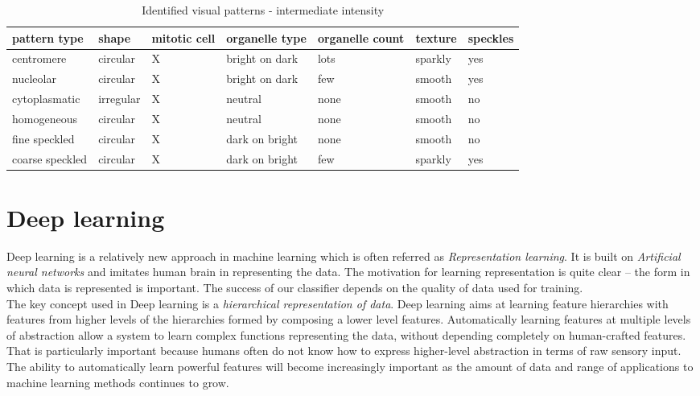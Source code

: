 \begin{table}
	\caption{Identified visual patterns - intermediate intensity}
	\label{tab:Vpatb}
	\small
	\begin{tabular}{|m{2.2cm}|m{1.4cm}|m{1.5cm}|m{1.5cm}|m{1.4cm}|m{1.6cm}|m{1.4cm}|}
		\hline
		\textbf{pattern type} & \textbf{shape} & \textbf{mitotic cell} & \textbf{organelle type} & \textbf{organelle count} & \textbf{texture} & \textbf{speckles} \\ \hline
		centromere & circular & X & bright on dark & lots & sparkly  & yes \\ \hline
		nucleolar & circular & X & bright on dark & few & smooth & yes \\ \hline
		cytoplasmatic & irregular & X & neutral & none & smooth  & no \\ \hline
		homogeneous & circular & X & neutral & none & smooth & no \\ \hline
		fine speckled & circular & X & dark on bright & none & smooth & no \\ \hline
		coarse speckled & circular & X & dark on bright & few & sparkly & yes \\ \hline
	\end{tabular}
	\normalsize
\end{table}



\section{Deep learning}

Deep learning is a relatively new approach in machine learning which is often referred  as \textit{Representation learning}. It is built on \textit{Artificial neural networks} and imitates human brain in representing the data. The motivation for learning representation is quite clear -- the form in which data is represented is important. The success of our classifier depends on the quality of data used for training. \\

The key concept used in Deep learning is a \textit{hierarchical representation of data}. Deep learning aims at learning feature hierarchies with features from higher levels of the hierarchies formed by composing a lower level features. Automatically learning features at multiple levels of abstraction allow a system to learn complex functions representing the data, without depending completely on human-crafted features. That is particularly important because humans often do not know how to express higher-level abstraction in terms of raw sensory input. The ability to automatically learn powerful features will become increasingly important as the amount of data and range of applications to machine learning methods continues to grow. \\

